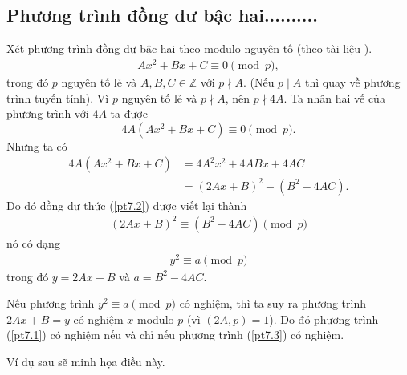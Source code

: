 \documentclass[12pt,a4paper,openany,oneside]{report}
\begin{document}
\subsection{Phương trình đồng dư bậc hai..........}
Xét phương trình đồng dư bậc hai theo modulo nguyên tố (theo tài liệu \cite{K2007}).
\begin{align}\label{pt7.1}
Ax^2 + Bx + C \equiv 0 \pmod{p},
\end{align}
trong đó $p$ nguyên tố lẻ và $A, B, C \in \mathbb{Z}$ với $p\nmid A$. (Nếu $p\mid A$ thì quay về phương trình tuyến tính). Vì $p$ nguyên tố lẻ và $p\nmid A$, nên $p\nmid 4A$. Ta nhân hai vế của phương trình với $4A$ ta được
\begin{equation}\label{pt7.2}
4A(Ax^2+Bx+C)\equiv 0\pmod p.
\end{equation}
Nhưng ta có 
\begin{align*}
4A(Ax^2+Bx+C)&=4A^2x^2+4ABx+4AC\\
&=(2Ax+B)^2-(B^2-4AC).
\end{align*}
Do đó đồng dư thức (\ref{pt7.2}) được viết lại thành
\begin{align*}
(2Ax+B)^2\equiv (B^2-4AC)\pmod p
\end{align*}
nó có dạng 
\begin{align}\label{pt7.3}
y^2\equiv a\pmod p
\end{align}
 trong đó $y=2Ax+B$ và $a=B^2-4AC$.\par 
Nếu phương trình $y^2\equiv a\pmod p$ có nghiệm, thì ta suy ra phương trình $2Ax+B=y$ có nghiệm $x$ modulo $p$ (vì $(2A,p)=1$). Do đó phương trình (\ref{pt7.1}) có nghiệm nếu và chỉ nếu phương trình (\ref{pt7.3}) có nghiệm.\par

Ví dụ sau sẽ minh họa điều này.
\end{document}
